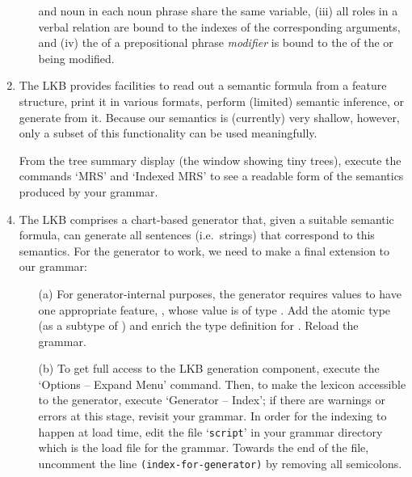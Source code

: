 \documentclass[10pt]{article}
\begin{document}
\begin{enumerate}
\begin{itemize}
                and noun in each noun phrase share the same 
                variable, (iii) all roles in a verbal relation are
                bound to the indexes of the corresponding arguments,
                and (iv) the  of a prepositional phrase 
                {\em modifier\/} is bound to the  of the
                 or  being modified.
        \end{itemize}
  \item The LKB provides facilities to read out a semantic formula from
        a feature structure, print it in various formats, perform
        (limited) semantic inference, or generate from it.  Because our
        semantics is (currently) very shallow, however, only a subset
        of this functionality can be used meaningfully.
  \item []
        From the tree summary display (the window showing tiny trees),
        execute the commands `MRS' and `Indexed MRS' to see a readable
        form of the semantics produced by your grammar.
  \item 
        The LKB comprises a chart-based generator that, given a
        suitable semantic formula, can generate all sentences (i.e.\
        strings) that correspond to this semantics.  
        For the generator to work, we need to make a final extension to
        our grammar:
        \begin{itemize}
          \item [(a)]
                For generator-internal purposes, the generator requires
                \att{INDEX} values to have one appropriate feature,
                \att{INSTLOC}, whose value is of type .
                Add the atomic type \type{instloc} (as a subtype of
                \type{*top*}) and enrich the type definition for
                \type{index}.  Reload the grammar.
          \item [(b)]
                To get full access to the LKB generation component,
                execute the `Options -- Expand Menu' command.  Then, to
                make the lexicon accessible to the generator, execute
                `Generator -- Index'; if there are warnings or errors
                at this stage, revisit your grammar.
                In order for the indexing to happen at load time, edit
                the file `{\tt script}' in your grammar directory which
                is the load file for the grammar.  Towards the
                end of the file, uncomment the line 
                {\tt (index-for-generator)} by removing all semicolons.

\end{itemize}
\end{enumerate}
\end{document}
